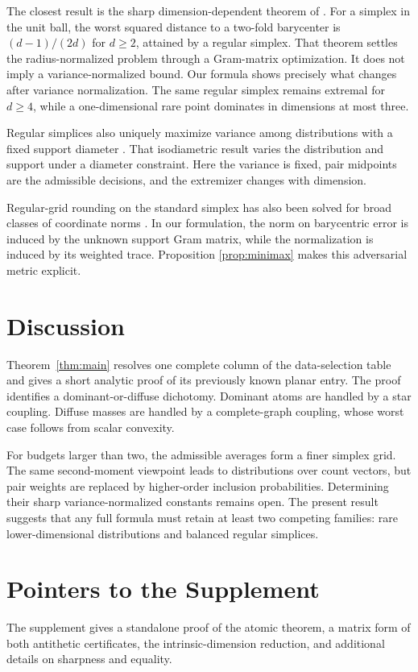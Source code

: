 \documentclass[twoside]{article}
\begin{document}
The closest result is the sharp dimension-dependent theorem of \citet{tinarrage2026sharp}. For a simplex in the unit ball, the worst squared distance to a two-fold barycenter is $(d-1)/(2d)$ for $d\geq2$, attained by a regular simplex. That theorem settles the radius-normalized problem through a Gram-matrix optimization. It does not imply a variance-normalized bound. Our formula shows precisely what changes after variance normalization. The same regular simplex remains extremal for $d\geq4$, while a one-dimensional rare point dominates in dimensions at most three.

Regular simplices also uniquely maximize variance among distributions with a fixed support diameter \citep{lim2022variance}. That isodiametric result varies the distribution and support under a diameter constraint. Here the variance is fixed, pair midpoints are the admissible decisions, and the extremizer changes with dimension.

Regular-grid rounding on the standard simplex has also been solved for broad classes of coordinate norms \citep{bomze2014rounding}. In our formulation, the norm on barycentric error is induced by the unknown support Gram matrix, while the normalization is induced by its weighted trace. Proposition \ref{prop:minimax} makes this adversarial metric explicit.

\section{Discussion}

Theorem~\ref{thm:main} resolves one complete column of the data-selection table and gives a short analytic proof of its previously known planar entry. The proof identifies a dominant-or-diffuse dichotomy. Dominant atoms are handled by a star coupling. Diffuse masses are handled by a complete-graph coupling, whose worst case follows from scalar convexity.

For budgets larger than two, the admissible averages form a finer simplex grid. The same second-moment viewpoint leads to distributions over count vectors, but pair weights are replaced by higher-order inclusion probabilities. Determining their sharp variance-normalized constants remains open. The present result suggests that any full formula must retain at least two competing families: rare lower-dimensional distributions and balanced regular simplices.

\balance


\appendix
\newpage
\section{Pointers to the Supplement}
The supplement gives a standalone proof of the atomic theorem, a matrix form of both antithetic certificates, the intrinsic-dimension reduction, and additional details on sharpness and equality.
\end{document}
